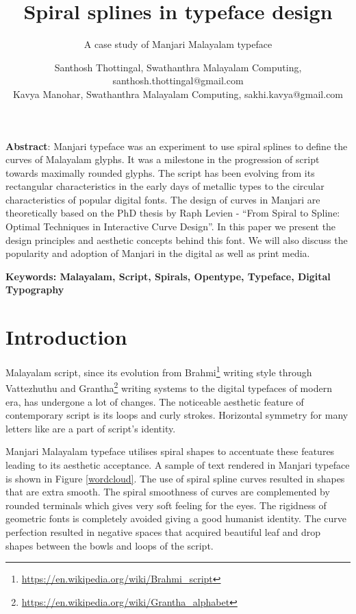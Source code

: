 \documentclass[11pt,twoside,a4paper,parskip=half]{scrartcl}
\title{Spiral splines in typeface design}
\subtitle{A case study of Manjari Malayalam typeface}
\author{%
Santhosh Thottingal, Swathanthra Malayalam Computing, santhosh.thottingal@gmail.com\\
Kavya Manohar, Swathanthra Malayalam Computing, sakhi.kavya@gmail.com
}
\begin{document}
\maketitle

\textbf{Abstract}: Manjari typeface was an experiment to use spiral splines to define the curves of Malayalam glyphs. It was a milestone in the progression of script towards maximally rounded glyphs. The script has been evolving from its rectangular characteristics in the early days of metallic types to the circular characteristics of popular digital fonts. The design of curves in Manjari are theoretically based on the PhD thesis by Raph Levien - ``From Spiral to Spline: Optimal Techniques in Interactive Curve Design”. In this paper we present the design principles and aesthetic concepts behind this font. We will also discuss the popularity and adoption of Manjari in the digital as well as print media.

\textbf{Keywords: Malayalam, Script, Spirals, Opentype, Typeface, Digital Typography}

\section{Introduction}

Malayalam script, since its evolution from Brahmi\footnote{\url{https://en.wikipedia.org/wiki/Brahmi_script}} writing style through Vattezhuthu and Grantha\footnote{\url{https://en.wikipedia.org/wiki/Grantha_alphabet}} writing systems to the digital typefaces of modern era, has undergone a lot of changes. The noticeable aesthetic feature of contemporary script is its loops and curly strokes. Horizontal symmetry for many letters like {} are a part of script's identity. 

Manjari Malayalam typeface utilises spiral shapes to accentuate these features leading to its aesthetic acceptance. A sample of text rendered in Manjari typeface is shown in Figure \ref{wordcloud}. The use of spiral spline curves resulted in shapes that are extra smooth. The spiral smoothness of curves are complemented by rounded terminals which gives very soft feeling for the eyes. The rigidness of geometric fonts is completely avoided giving a good humanist identity. The curve perfection resulted in negative spaces that acquired beautiful leaf and drop shapes between the bowls and loops of the script. 
\end{document}
